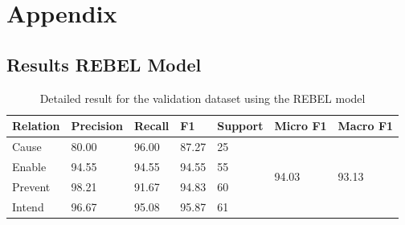 \documentclass[
hf, %
]{ceurart}
\begin{document}






\pagebreak


\appendix

\section{Appendix}
\label{sec:appendix}

\subsection{Results REBEL Model}
\begin{table}[!h]
	\centering
	\begin{tabular}{|l|l|l|l|l|l|l|}
		\hline
		\textbf{Relation} & \textbf{Precision} & \textbf{Recall} & \textbf{F1} & \textbf{Support} & \textbf{Micro F1}      & \textbf{Macro F1}      \\ \hline
		Cause             & 80.00              & 96.00           & 87.27       & 25               & \multirow{4}{*}{94.03} & \multirow{4}{*}{93.13} \\ \cline{1-5}
		Enable            & 94.55              & 94.55           & 94.55       & 55               &                        &                        \\ \cline{1-5}
		Prevent           & 98.21              & 91.67           & 94.83       & 60               &                        &                        \\ \cline{1-5}
		Intend            & 96.67              & 95.08           & 95.87       & 61               &                        &                        \\ \hline
	\end{tabular}
	\caption{Detailed result for the validation dataset using the REBEL model}
	\label{apx:val_result_rebel}
\end{table}
\end{document}
